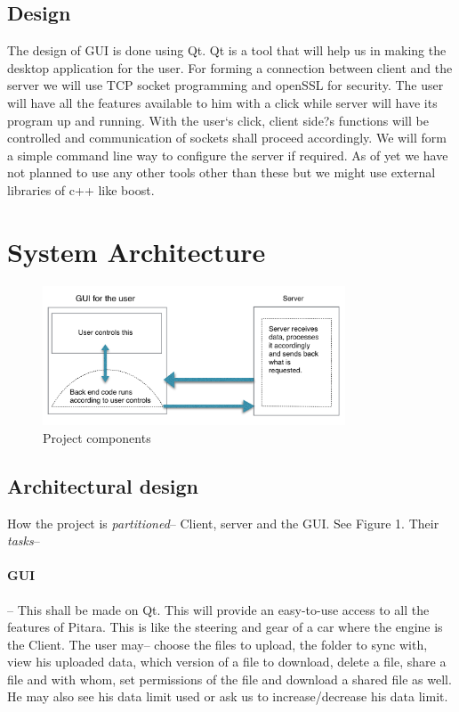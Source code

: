 \documentclass{article}
\begin{document}
	\subsection{Design}
	The design of GUI is done using Qt. Qt is a tool that will help us in making the desktop application for the user. For forming a connection between client and the server we will use TCP socket programming and openSSL for security. The user will have all the features available to him with a click while server will have its program up and running. With the user`s click, client side?s functions will be controlled and communication of sockets shall proceed accordingly. We will form a simple command line way to configure the server if required. As of yet we have not planned to use any other tools other than these but we might use external libraries of c++ like boost.
	\section{System Architecture}\label{sysarch}
	\begin{figure}
\centering
\includegraphics[width=90mm]{diagram.png} 
\caption{Project components}\label{this}
\end{figure}
	\subsection{Architectural design}
	How the project is \emph{partitioned}-- Client, server and the GUI. See Figure 1.
Their \emph{tasks}-- 
\paragraph{GUI}-- This shall be made on Qt. This will provide an easy-to-use access to all the features of Pitara. This is like the steering and gear of a car where the engine is the Client. 
The user may-- choose the files to upload, the folder to sync with, view his uploaded data, which version of a file to download, delete a file, share a file and with whom, set permissions of the file and download a shared file as well. He may also see his data limit used or ask us to increase/decrease his data limit.
\end{document}
